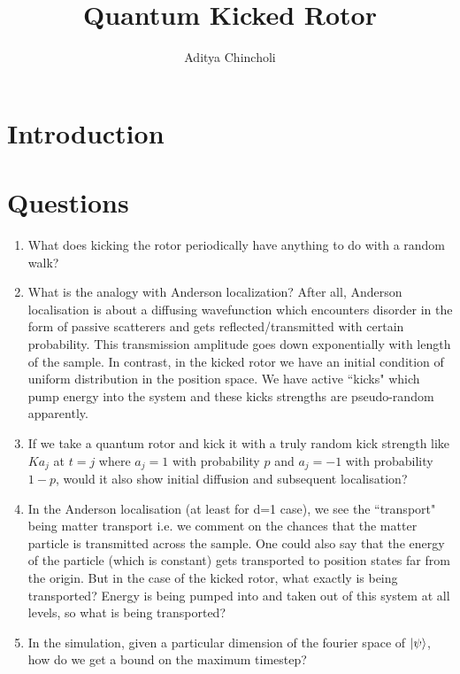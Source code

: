 \documentclass[12pt]{article}
\title{Quantum Kicked Rotor}
\author{Aditya Chincholi}
\begin{document}
\maketitle

\section{Introduction}

\section{Questions}
\begin{enumerate}
    \item What does kicking the rotor periodically have anything to do with
    a random walk?

    \item What is the analogy with Anderson localization? After all, Anderson
    localisation is about a diffusing wavefunction which encounters disorder in
    the form of passive scatterers and gets reflected/transmitted with certain
    probability. This transmission amplitude goes down exponentially with length
    of the sample. In contrast, in the kicked rotor we have an initial condition
    of uniform distribution in the position space. We have active ``kicks" which
    pump energy into the system and these kicks strengths are pseudo-random
    apparently.

    \item \label{ques:trulyrandom} If we take a quantum rotor and kick it with a
    truly random kick strength like $Ka_j$ at $t = j$ where $a_j = 1$ with
    probability $p$ and $a_j = -1$ with probability $1-p$, would it also show
    initial diffusion and subsequent localisation?

    \item In the Anderson localisation (at least for d=1 case), we see the
    ``transport" being matter transport i.e. we comment on the chances that the
    matter particle is transmitted across the sample. One could also say that
    the energy of the particle (which is constant) gets transported to position
    states far from the origin. But in the case of the kicked rotor, what
    exactly is being transported? Energy is being pumped into and taken out of
    this system at all levels, so what is being transported?

    \item \label{ques:timestepsbound} In the simulation, given a particular
    dimension of the fourier space of $\ket{\psi}$, how do we get a bound on
    the maximum timestep?

\end{enumerate}
\end{document}
